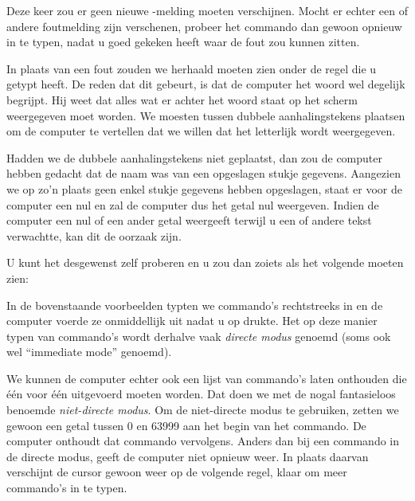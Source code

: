 
Deze keer zou er geen nieuwe -melding moeten verschijnen. Mocht er echter een of andere foutmelding zijn verschenen, probeer het commando dan gewoon opnieuw in te typen, nadat u goed gekeken heeft waar de fout zou kunnen zitten.

In plaats van een fout zouden we  herhaald moeten zien onder de regel die u getypt heeft. De reden dat dit gebeurt, is dat de computer het woord  wel degelijk begrijpt. Hij weet dat alles wat er achter het woord  staat op het scherm weergegeven moet worden. We moesten  tussen dubbele aanhalingstekens plaatsen om de computer te vertellen dat we willen dat het letterlijk wordt weergegeven.

Hadden we de dubbele aanhalingstekens niet geplaatst, dan zou de computer hebben gedacht dat  de naam was van een opgeslagen stukje gegevens. Aangezien we op zo'n plaats geen enkel stukje gegevens hebben opgeslagen, staat er voor de computer een nul en zal de computer dus het getal nul weergeven. Indien de computer een nul of een ander getal weergeeft terwijl u een of andere tekst verwachtte, kan dit de oorzaak zijn.

\needspace{4cm} %
U kunt het desgewenst zelf proberen en u zou dan zoiets als het volgende moeten zien:


In de bovenstaande voorbeelden typten we commando's rechtstreeks in en de computer voerde ze onmiddellijk uit nadat u op  drukte. Het op deze manier typen van commando's wordt derhalve vaak {\em directe modus} genoemd (soms ook wel ``immediate mode'' genoemd).

We kunnen de computer echter ook een lijst van commando's laten onthouden die één voor één uitgevoerd moeten worden. Dat doen we met de nogal fantasieloos benoemde {\em niet-directe modus}. Om de niet-directe modus te gebruiken, zetten we gewoon een getal tussen 0 en 63999 aan het begin van het commando. De computer onthoudt dat commando vervolgens. Anders dan bij een commando in de directe modus, geeft de computer niet opnieuw  weer. In plaats daarvan verschijnt de cursor gewoon weer op de volgende regel, klaar om meer commando's in te typen.

